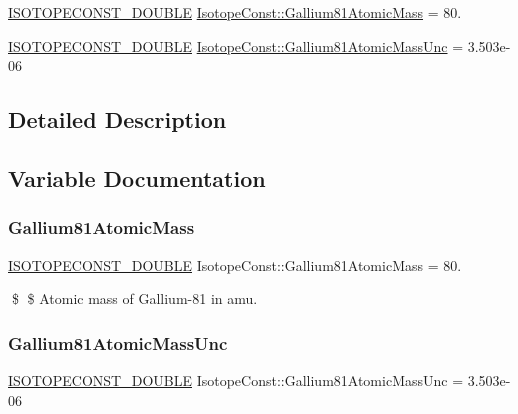 \begin{DoxyCompactItemize}
\item 
\mbox{\hyperlink{group___isotope_const-_macros_ga8f45a7272ce02c0b4c65c44636ed719a}{I\+S\+O\+T\+O\+P\+E\+C\+O\+N\+S\+T\+\_\+\+D\+O\+U\+B\+LE}} \mbox{\hyperlink{group___isotope_const-_gallium-_ga81_ga88642eb0a9f8ec5ee20cff706bfa5aa1}{Isotope\+Const\+::\+Gallium81\+Atomic\+Mass}} = 80.
\item 
\mbox{\hyperlink{group___isotope_const-_macros_ga8f45a7272ce02c0b4c65c44636ed719a}{I\+S\+O\+T\+O\+P\+E\+C\+O\+N\+S\+T\+\_\+\+D\+O\+U\+B\+LE}} \mbox{\hyperlink{group___isotope_const-_gallium-_ga81_ga1d34f1c433b37d54063c78e35b2f51cb}{Isotope\+Const\+::\+Gallium81\+Atomic\+Mass\+Unc}} = 3.\+503e-\/06
\end{DoxyCompactItemize}


\subsection{Detailed Description}


\subsection{Variable Documentation}
\mbox{\label{group___isotope_const-_gallium-_ga81_ga88642eb0a9f8ec5ee20cff706bfa5aa1}} 
\subsubsection{\texorpdfstring{Gallium81\+Atomic\+Mass}{Gallium81AtomicMass}}
{\footnotesize\ttfamily \mbox{\hyperlink{group___isotope_const-_macros_ga8f45a7272ce02c0b4c65c44636ed719a}{I\+S\+O\+T\+O\+P\+E\+C\+O\+N\+S\+T\+\_\+\+D\+O\+U\+B\+LE}} Isotope\+Const\+::\+Gallium81\+Atomic\+Mass = 80.}

\$ \$ Atomic mass of Gallium-\/81 in amu. \mbox{\label{group___isotope_const-_gallium-_ga81_ga1d34f1c433b37d54063c78e35b2f51cb}} 
\subsubsection{\texorpdfstring{Gallium81\+Atomic\+Mass\+Unc}{Gallium81AtomicMassUnc}}
{\footnotesize\ttfamily \mbox{\hyperlink{group___isotope_const-_macros_ga8f45a7272ce02c0b4c65c44636ed719a}{I\+S\+O\+T\+O\+P\+E\+C\+O\+N\+S\+T\+\_\+\+D\+O\+U\+B\+LE}} Isotope\+Const\+::\+Gallium81\+Atomic\+Mass\+Unc = 3.\+503e-\/06}

